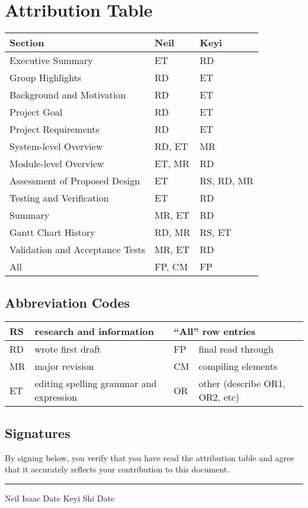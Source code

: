 \thispagestyle{empty}

\section*{Attribution Table}

\begin{tabular}{|l|l|l|}
	\hline
	\textbf{Section} & \textbf{Neil} & \textbf{Keyi} \\
	\hline \hline
	Executive Summary & ET & RD \\
	Group Highlights & RD & ET \\
	\hline
	Background and Motivation & RD & ET \\
	Project Goal & RD & ET \\
	Project Requirements & RD & ET \\
	\hline
	System-level Overview & RD, ET & MR \\
	Module-level Overview & ET, MR & RD \\
	Assessment of Proposed Design & ET & RS, RD, MR \\
	\hline
	Testing and Verification & ET & RD \\
	\hline
	Summary & MR, ET & RD \\
	\hline
	Gantt Chart History & RD, MR & RS, ET \\
	Validation and Acceptance Tests & MR, ET & RD \\
	\hline
	All & FP, CM & FP \\
	\hline
\end{tabular}

\subsection*{Abbreviation Codes}

\begin{tabular}[width=7in]{|l|l||l|l|}
	\hline
	RS & research and information & \multicolumn{2}{l|}{``All'' row entries} \\ \hline
	RD & wrote first draft & FP & final read through \\ \hline
	MR & major revision & CM & compiling elements \\ \hline
	ET & editing spelling grammar and expression & OR & other (describe OR1, OR2, etc) \\ \hline
\end{tabular}

\subsection*{Signatures}

By signing below, you verify that you have read the attribution table and agree that it accurately reflects your contribution to this document.

\vfill

\hrule
Neil Isaac \hspace{1in} Date \hspace{1in} Keyi Shi \hspace{1in} Date

